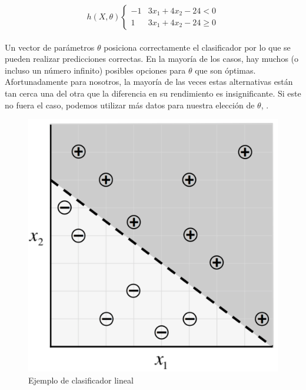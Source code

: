     \begin{equation}
        h(X,\theta)\begin{cases}-1 & 3x_1+ 4x_2-24< 0\\
        1 &  3x_1+ 4x_2-24 \geq 0\end{cases}
    \end{equation}
    \\
    Un vector de parámetros $\theta$ posiciona correctamente el clasificador por lo que se pueden realizar predicciones correctas. En la mayoría de los casos, hay muchos (o incluso un número infinito) posibles opciones para $\theta$ que son óptimas. Afortunadamente para nosotros, la mayoría de las veces estas alternativas están tan cerca una del otra que la diferencia en su rendimiento es insignificante. Si este no fuera el caso, podemos utilizar más datos para nuestra elección de $\theta$, \cite{dlBook}.
    \begin{figure}[htp]
        \centering
        \includegraphics[scale=0.33]{chapter3/sampleData.png}
        \caption{Ejemplo de clasificador lineal}
        \label{fig:sdata}
    \end{figure}




